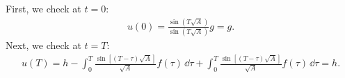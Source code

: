 First, we check at $t=0$:
\begin{eqnarray}
    \label{eq:check-0}
    u(0) = \frac{\sin{(T\sqrt{A})}}{\sin{(T\sqrt{A})}}g = g
.\end{eqnarray}
Next, we check at $t=T$:
\begin{eqnarray}
    \label{eq:check-T}
    u(T) = h - \int_{0}^{T} \frac{\sin[(T-\tau)\sqrt{A}]}{\sqrt{A}}f(\tau)\,\dd{\tau} + \int_{0}^{T} \frac{\sin[(T-\tau)\sqrt{A}]}{\sqrt{A}}f(\tau)\,\dd{\tau} = h
.\end{eqnarray}




